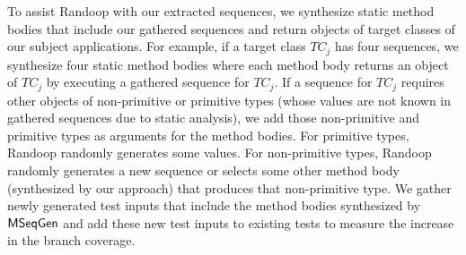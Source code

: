 To assist Randoop with our extracted sequences, we synthesize static method bodies that include our gathered sequences and return objects of target classes of our subject applications. For example, if a target class $TC_j$ has four sequences, we synthesize four static method bodies where each method body returns an object of $TC_j$ by executing a gathered sequence for $TC_j$. If a sequence for $TC_j$ requires other objects of non-primitive or primitive types (whose values are not known in gathered sequences due to static analysis), we add those non-primitive and primitive types as arguments for the method bodies. For primitive types, Randoop randomly generates some values. For non-primitive types, Randoop randomly generates a new sequence or selects some other method body (synthesized by our approach) that produces that non-primitive type. We gather newly generated test inputs that include the method bodies synthesized by $\textsf{MSeqGen} $ and add these new test inputs to existing tests to measure the increase in the branch coverage. 

